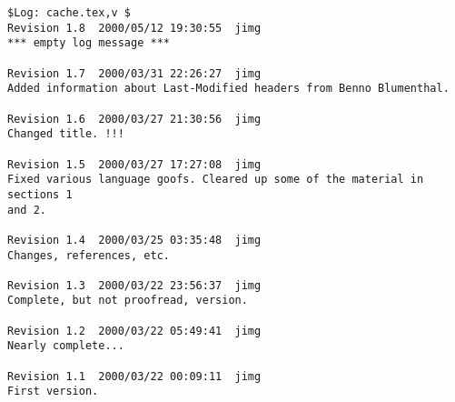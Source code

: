 \documentclass{article}
\begin{document}
\begin{verbatim}
$Log: cache.tex,v $
Revision 1.8  2000/05/12 19:30:55  jimg
*** empty log message ***

Revision 1.7  2000/03/31 22:26:27  jimg
Added information about Last-Modified headers from Benno Blumenthal.

Revision 1.6  2000/03/27 21:30:56  jimg
Changed title. !!!

Revision 1.5  2000/03/27 17:27:08  jimg
Fixed various language goofs. Cleared up some of the material in sections 1
and 2.

Revision 1.4  2000/03/25 03:35:48  jimg
Changes, references, etc.

Revision 1.3  2000/03/22 23:56:37  jimg
Complete, but not proofread, version.

Revision 1.2  2000/03/22 05:49:41  jimg
Nearly complete...

Revision 1.1  2000/03/22 00:09:11  jimg
First version.

\end{verbatim}


\raggedright


\end{document}
